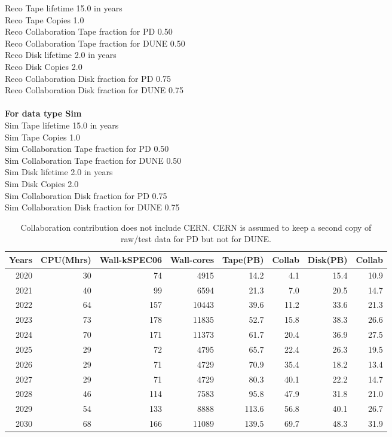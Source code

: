 \documentclass[12pt]{article}
\begin{document}
  Reco Tape lifetime  15.0 in years\\
  Reco Tape Copies   1.0\\
  Reco Collaboration Tape fraction for PD  0.50\\
  Reco Collaboration Tape fraction for DUNE  0.50\\
  Reco Disk lifetime   2.0 in years\\
  Reco Disk Copies   2.0\\
  Reco Collaboration Disk fraction for PD  0.75\\
  Reco Collaboration Disk fraction for DUNE  0.75\\
\\
{\bf For data type Sim}\\
   Sim Tape lifetime  15.0 in years\\
   Sim Tape Copies   1.0\\
   Sim Collaboration Tape fraction for PD  0.50\\
   Sim Collaboration Tape fraction for DUNE  0.50\\
   Sim Disk lifetime   2.0 in years\\
   Sim Disk Copies   2.0\\
   Sim Collaboration Disk fraction for PD  0.75\\
   Sim Collaboration Disk fraction for DUNE  0.75\\
\begin{table}
 \centering \begin{tabular}[h]{rrrrrrrr}
Years&CPU(Mhrs)&Wall-kSPEC06&Wall-cores&Tape(PB)&Collab &Disk(PB) &Collab\\
\hline
2020&	       30&	       74&	     4915&	     14.2&	      4.1&	     15.4&	     10.9\\
2021&	       40&	       99&	     6594&	     21.3&	      7.0&	     20.5&	     14.7\\
2022&	       64&	      157&	    10443&	     39.6&	     11.2&	     33.6&	     21.3\\
2023&	       73&	      178&	    11835&	     52.7&	     15.8&	     38.3&	     26.6\\
2024&	       70&	      171&	    11373&	     61.7&	     20.4&	     36.9&	     27.5\\
2025&	       29&	       72&	     4795&	     65.7&	     22.4&	     26.3&	     19.5\\
2026&	       29&	       71&	     4729&	     70.9&	     35.4&	     18.2&	     13.4\\
2027&	       29&	       71&	     4729&	     80.3&	     40.1&	     22.2&	     14.7\\
2028&	       46&	      114&	     7583&	     95.8&	     47.9&	     31.8&	     21.0\\
2029&	       54&	      133&	     8888&	    113.6&	     56.8&	     40.1&	     26.7\\
2030&	       68&	      166&	    11089&	    139.5&	     69.7&	     48.3&	     31.9\\
\end{tabular}
\caption{Collaboration contribution does not include CERN. CERN is assumed to keep a second copy of raw/test data for PD but not for DUNE. }\end{table}
\end{document}
